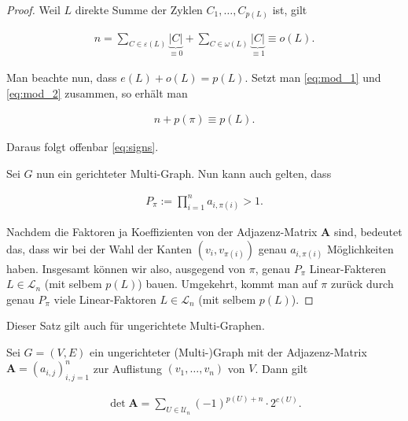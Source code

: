 \begin{proof}
            Weil $L$ direkte Summe der Zyklen $C_1, \dots, C_{p(L)}$ ist, gilt

            \begin{align} \label{eq:mod_2}
                n
                =
                \sum_{C \in \varepsilon(L)} \underbrace{|C|}_{\equiv 0}
                +
                \sum_{C \in \omega(L)} \underbrace{|C|}_{\equiv 1}
                \equiv
                o(L).
            \end{align}

            Man beachte nun, dass $e(L) + o(L) = p(L)$.
            Setzt man \eqref{eq:mod_1} und \eqref{eq:mod_2} zusammen, so erhält man

            \begin{align*}
                n + p(\pi) \equiv p(L).
            \end{align*}

            Daraus folgt offenbar \eqref{eq:signs}.

            Sei $G$ nun ein gerichteter Multi-Graph.
            Nun kann auch gelten, dass

            \begin{align*}
                P_\pi
                :=
                \prod_{i=1}^n a_{i, \pi(i)}
                >
                1.
            \end{align*}

            Nachdem die Faktoren ja Koeffizienten von der Adjazenz-Matrix $\mathbf A$ sind, bedeutet das, dass wir bei der Wahl der Kanten $(v_i, v_{\pi(i)})$ genau $a_{i, \pi(i)}$ Möglichkeiten haben.
            Insgesamt können wir also, ausgegend von $\pi$, genau $P_\pi$ Linear-Fakteren $L \in \mathcal L_n$ (mit selbem $p(L)$) bauen.
            Umgekehrt, kommt man auf $\pi$ zurück durch genau $P_\pi$ viele Linear-Faktoren $L \in \mathcal L_n$ (mit selbem $p(L)$).

        \end{proof}

        Dieser Satz gilt auch für ungerichtete Multi-Graphen.

        \begin{corollary} \label{cor:det}

            Sei $G = (V, E)$ ein ungerichteter (Multi-)Graph mit der Adjazenz-Matrix $\mathbf A = (a_{i,j})_{i,j=1}^n$ zur Auflistung $(v_1, \dots, v_n)$ von $V$.
            Dann gilt

            \begin{align} \label{eq:det_undirected}
                \det \mathbf A
                =
                \sum_{U \in \mathcal U_n}
                    (-1)^{p(U) + n} \cdot 2^{c(U)}.
            \end{align}

        \end{corollary}

